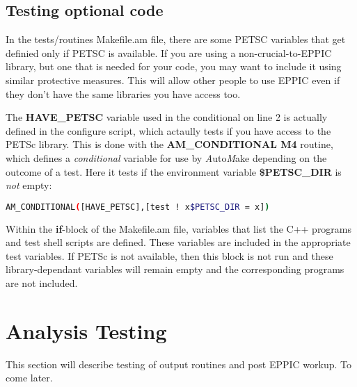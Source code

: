 \subsection{Testing optional code}
In the tests/routines Makefile.am file, there are some PETSC variables
that get definied only if PETSC is available. If you are using a
non-crucial-to-EPPIC library, but one that is needed for  your code,
you may want 
to include it using similar protective measures. This will allow other
people to use EPPIC even if they don't have the same libraries you
have access too. 

%     

The \textbf{HAVE\_PETSC} variable used in the conditional on line 2 is
actually defined in the configure script, which actaully tests if you
have access to the PETSc library. This is done with the
\textbf{AM\_CONDITIONAL M4} routine, which defines a
\emph{conditional} variable for use by \emph{A}uto\emph{M}ake
depending on the outcome of a test. Here it tests if the environment
variable \textbf{\$PETSC\_DIR} is \emph{not} empty:
\begin{lstlisting}[language=bash,title=Defining HAVE\_PETSC in the
  configure script]
AM_CONDITIONAL([HAVE_PETSC],[test ! x$PETSC_DIR = x])
\end{lstlisting}
Within the \textbf{if}-block of the Makefile.am file, variables that list the
C++ programs and test shell scripts are defined. These variables are
included in the appropriate test variables. If PETSc is not available,
then this block is not run and these library-dependant variables will
remain empty and the corresponding programs are not included. 

\section{Analysis Testing}

This section will describe testing of output routines and post EPPIC
workup. To come later. 